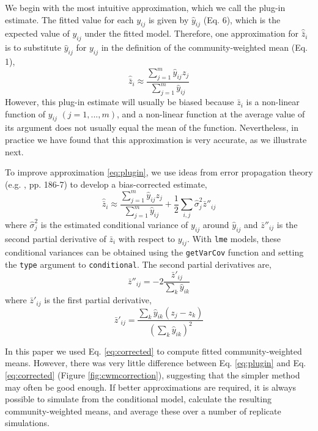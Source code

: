 \documentclass[12pt]{ecologyFORAPPENDIX}
\begin{document}
We begin with the most intuitive approximation, which we call the plug-in estimate.  The fitted value for each $y_{ij}$ is given by $\hat{y}_{ij}$ (Eq. 6), which is the expected value of $y_{ij}$ under the fitted model.  Therefore, one approximation for $\hat{\bar{z}}_i$ is to substitute $\hat{y}_{ij}$ for $y_{ij}$ in the definition of the community-weighted mean (Eq. 1),
\begin{equation}
\hat{\bar{z}}_i \approx \frac{\sum_{j=1}^m \hat{y}_{ij} z_j}{\sum_{j=1}^m \hat{y}_{ij}}
\label{eq:plugin}
\end{equation}
However, this plug-in estimate will usually be biased because $\bar{z}_i$ is a non-linear function of $y_{ij}$ $(j = 1,...,m)$, and a non-linear function at the average value of its argument does not usually equal the mean  of the function.  Nevertheless, in practice we have found that this approximation is very accurate, as we illustrate next.

To improve approximation \ref{eq:plugin}, we use ideas from error propagation theory (e.g. , pp. 186-7) to develop a bias-corrected estimate,
\begin{equation}
\hat{\bar{z}}_i \approx \frac{\sum_{j=1}^m \hat{y}_{ij} z_j}{\sum_{j=1}^m \hat{y}_{ij}} + \frac{1}{2} \sum_{i, j} \hat{\sigma}_j^2 \bar{z}''_{ij}
\label{eq:corrected}
\end{equation}
where $\hat{\sigma}_j^2$ is the estimated conditional variance of $y_{ij}$ around $\hat{y}_{ij}$ and $\bar{z}''_{ij}$ is the second partial derivative of $\bar{z}_i$ with respect to $y_{ij}$.  With \texttt{lme} models, these conditional variances can be obtained using the \texttt{getVarCov} function and setting the \texttt{type} argument to \texttt{conditional}.  The second partial derivatives are,
\begin{equation}
\bar{z}''_{ij} = -2 \frac{\bar{z}'_{ij}}{\sum_k \hat{y}_{ik}}
\end{equation}
where $\bar{z}'_{ij}$ is the first partial derivative,
\begin{equation}
\bar{z}'_{ij} = \frac{\sum_k \hat{y}_{ik} (z_j - z_k)}{\left( \sum_k \hat{y}_{ik} \right)^2}
\end{equation}

In this paper we used Eq. \ref{eq:corrected} to compute fitted community-weighted means.  However, there was very little difference between Eq. \ref{eq:plugin} and Eq. \ref{eq:corrected} (Figure \ref{fig:cwmcorrection}), suggesting that the simpler method may often be good enough.  If better approximations are required, it is always possible to simulate from the conditional model, calculate the resulting community-weighted means, and average these over a number of replicate simulations.
\end{document}
